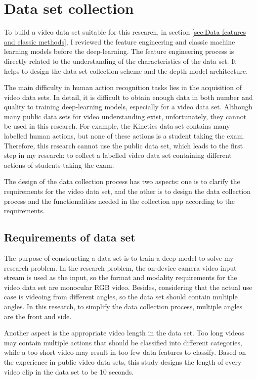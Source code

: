 \section{Data set collection}
\label{sec:Data set collection}
To build a video data set suitable for this research, in section \ref{sec:Data features and classic methods}, I reviewed the feature engineering and classic machine learning models before the deep-learning.
The feature engineering process is directly related to the understanding of the characteristics of the data set.
It helps to design the data set collection scheme and the depth model architecture.

The main difficulty in human action recognition tasks lies in the acquisition of video data sets.
In detail, it is difficult to obtain enough data in both number and quality to training deep-learning models, especially for a video data set.
Although many public data sets for video understanding exist, unfortunately, they cannot be used in this research.
For example, the Kinetics data set contains many labelled human actions, but none of these actions is a student taking the exam.
Therefore, this research cannot use the public data set, which leads to the first step in my research: to collect a labelled video data set containing different actions of students taking the exam.

The design of the data collection process has two aspects: one is to clarify the requirements for the video data set, and the other is to design the data collection process and the functionalities needed in the collection app according to the requirements.

\subsection{Requirements of data set}
The purpose of constructing a data set is to train a deep model to solve my research problem.
In the research problem, the on-device camera video input stream is used as the input, so the format and modality requirements for the video data set are monocular RGB video.
Besides, considering that the actual use case is videoing from different angles, so the data set should contain multiple angles.
In this research, to simplify the data collection process, multiple angles are the front and side.

Another aspect is the appropriate video length in the data set.
Too long videos may contain multiple actions that should be classified into different categories, while a too short video may result in too few data features to classify.
Based on the experience in public video data sets, this study designs the length of every video clip in the data set to be 10 seconds.

